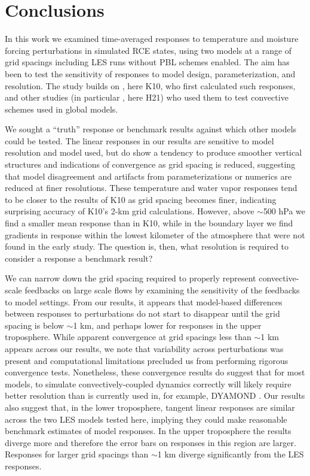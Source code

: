 \documentclass[draft]{agujournal2019}
\begin{document}
\section{Conclusions}
\label{sec:conclusions}

In this work we examined time-averaged responses to temperature and moisture
forcing perturbations in simulated RCE states, using two models at a range of
grid spacings including LES runs without PBL schemes enabled. The aim has been
to test the sensitivity of responses to model design, parameterization, and
resolution. The study builds on , here K10, who first
calculated such responses, and other studies (in particular
, here H21) who used them to test convective schemes
used in global models.

We sought a ``truth'' response or benchmark results against which other models
could be tested. The linear responses in our results are sensitive to model
resolution and model used, but do show a tendency to produce smoother vertical
structures and indications of convergence as grid spacing is reduced, suggesting
that model disagreement and artifacts from parameterizations or numerics are
reduced at finer resolutions. These temperature and water vapor responses tend
to be closer to the results of K10 as grid spacing becomes finer, indicating
surprising accuracy of K10's 2-km grid calculations. However, above $\sim$500
hPa we find a smaller mean response than in K10, while in the boundary layer we
find gradients in response within the lowest kilometer of the atmosphere that
were not found in the early study. The question is, then, what resolution is
required to consider a response a benchmark result?

We can narrow down the grid spacing required to properly represent
convective-scale feedbacks on large scale flows by examining the sensitivity of
the feedbacks to model settings. From our results, it appears that model-based
differences between responses to perturbations do not start to disappear until
the grid spacing is below $\sim$1 km, and perhaps lower for responses in the
upper troposphere. While apparent convergence at grid spacings less than $\sim$1
km appears across our results, we note that variability across perturbations was
present and computational limitations precluded us from performing rigorous
convergence tests. Nonetheless, these convergence results do suggest that for
most models, to simulate convectively-coupled dynamics correctly will likely
require better resolution than is currently used in, for example, DYAMOND
\cite{Stevens_PEPS_2019}. Our results also suggest that, in the lower
troposphere, tangent linear responses are similar across the two LES models
tested here, implying they could make reasonable benchmark estimates of model
responses. In the upper troposphere the results diverge more and therefore the
error bars on responses in this region are larger. Responses for larger grid
spacings than $\sim$1 km diverge significantly from the LES responses.
\end{document}
